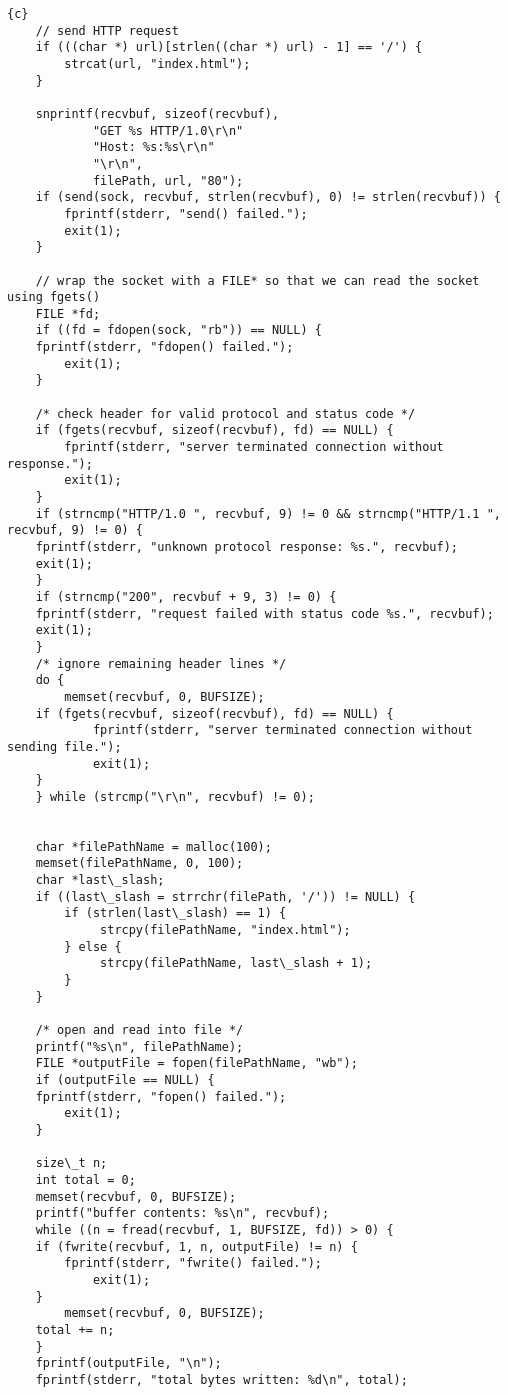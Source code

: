 \begin{lstlisting}{c}
    // send HTTP request
    if (((char *) url)[strlen((char *) url) - 1] == '/') {
        strcat(url, "index.html");
    }

    snprintf(recvbuf, sizeof(recvbuf), 
            "GET %s HTTP/1.0\r\n"
            "Host: %s:%s\r\n"
            "\r\n",
            filePath, url, "80");
    if (send(sock, recvbuf, strlen(recvbuf), 0) != strlen(recvbuf)) {
        fprintf(stderr, "send() failed.");
        exit(1);
    }

    // wrap the socket with a FILE* so that we can read the socket using fgets()
    FILE *fd;
    if ((fd = fdopen(sock, "rb")) == NULL) {
	fprintf(stderr, "fdopen() failed.");
        exit(1);
    }

    /* check header for valid protocol and status code */
    if (fgets(recvbuf, sizeof(recvbuf), fd) == NULL) {
        fprintf(stderr, "server terminated connection without response.");
        exit(1);
    } 
    if (strncmp("HTTP/1.0 ", recvbuf, 9) != 0 && strncmp("HTTP/1.1 ", recvbuf, 9) != 0) {
	fprintf(stderr, "unknown protocol response: %s.", recvbuf);
	exit(1);
    }
    if (strncmp("200", recvbuf + 9, 3) != 0) {
	fprintf(stderr, "request failed with status code %s.", recvbuf);
	exit(1);
    }
    /* ignore remaining header lines */
    do {
        memset(recvbuf, 0, BUFSIZE);
	if (fgets(recvbuf, sizeof(recvbuf), fd) == NULL) {
            fprintf(stderr, "server terminated connection without sending file.");
            exit(1);
	}
    } while (strcmp("\r\n", recvbuf) != 0);


    char *filePathName = malloc(100);
    memset(filePathName, 0, 100);
    char *last\_slash;
    if ((last\_slash = strrchr(filePath, '/')) != NULL) {
        if (strlen(last\_slash) == 1) {
             strcpy(filePathName, "index.html");
        } else {
             strcpy(filePathName, last\_slash + 1);
        }
    }
    
    /* open and read into file */
    printf("%s\n", filePathName);
    FILE *outputFile = fopen(filePathName, "wb");
    if (outputFile == NULL) {
	fprintf(stderr, "fopen() failed.");
        exit(1);
    }

    size\_t n;
    int total = 0;
    memset(recvbuf, 0, BUFSIZE);
    printf("buffer contents: %s\n", recvbuf);
    while ((n = fread(recvbuf, 1, BUFSIZE, fd)) > 0) {
	if (fwrite(recvbuf, 1, n, outputFile) != n) {
	    fprintf(stderr, "fwrite() failed.");
            exit(1);
	}
        memset(recvbuf, 0, BUFSIZE);
	total += n;
    }
    fprintf(outputFile, "\n");
    fprintf(stderr, "total bytes written: %d\n", total);
    

\end{lstlisting}
